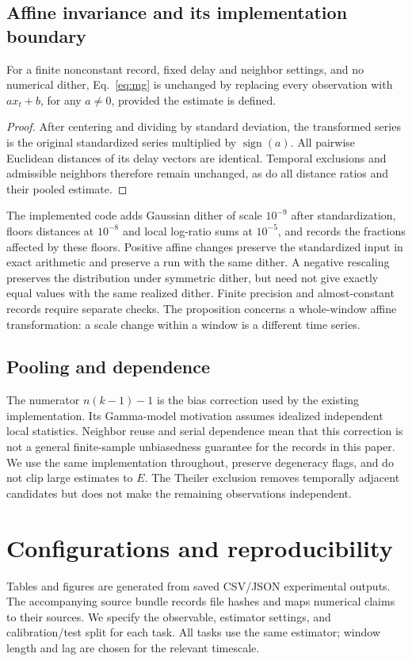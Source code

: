 {\subsection{Affine invariance and its implementation boundary}
\begin{proposition}
For a finite nonconstant record, fixed delay and neighbor settings, and no numerical dither, Eq.~\eqref{eq:mg} is unchanged by replacing every observation with $ax_t+b$, for any $a\ne0$, provided the estimate is defined.
\end{proposition}
\begin{proof}
After centering and dividing by standard deviation, the transformed series is the original standardized series multiplied by $\operatorname{sign}(a)$. All pairwise Euclidean distances of its delay vectors are identical. Temporal exclusions and admissible neighbors therefore remain unchanged, as do all distance ratios and their pooled estimate.
\end{proof}
The implemented code adds Gaussian dither of scale $10^{-9}$ after standardization, floors distances at $10^{-8}$ and local log-ratio sums at $10^{-5}$, and records the fractions affected by these floors. Positive affine changes preserve the standardized input in exact arithmetic and preserve a run with the same dither. A negative rescaling preserves the distribution under symmetric dither, but need not give exactly equal values with the same realized dither. Finite precision and almost-constant records require separate checks. The proposition concerns a whole-window affine transformation: a scale change within a window is a different time series.

\subsection{Pooling and dependence}
The numerator $n(k-1)-1$ is the bias correction used by the existing implementation. Its Gamma-model motivation assumes idealized independent local statistics. Neighbor reuse and serial dependence mean that this correction is not a general finite-sample unbiasedness guarantee for the records in this paper. We use the same implementation throughout, preserve degeneracy flags, and do not clip large estimates to $E$. The Theiler exclusion removes temporally adjacent candidates but does not make the remaining observations independent.

\section{Configurations and reproducibility}\label{app:settings}
Tables and figures are generated from saved CSV/JSON experimental outputs. The accompanying source bundle records file hashes and maps numerical claims to their sources. We specify the observable, estimator settings, and calibration/test split for each task. All tasks use the same estimator; window length and lag are chosen for the relevant timescale.

}
